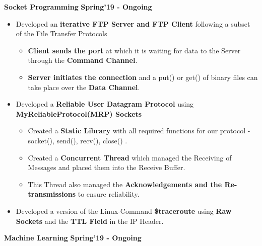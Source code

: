 \documentclass[10pt]{article}
\begin{document}
\large {\textbf{Socket Programming}} \normalsize 
\href{https://github.com/shmundhra/Socket-Programming}{\faGithub}
{\hfill} \textbf{Spring'19 - Ongoing}\\[-1.7em]
\begin{itemize}
\item 
\begingroup
    \fontsize{11pt}{12pt}\selectfont
    Developed an \textbf{iterative FTP Server and FTP Client} following a subset of the File Transfer Protocols \\[-1.7em]   
\endgroup
    \begin{itemize}
    \item \textbf{Client sends the port} at which it is waiting for data to the Server through the \textbf{Command Channel}. \\[-1.65em]
    \item \textbf{Server initiates the connection} and a put() or get() of binary files can take place over the \textbf{Data Channel}. \\[-1.65em]
    \end{itemize}
\item 
\begingroup
    \fontsize{11pt}{12pt}\selectfont
    Developed a \textbf{Reliable User Datagram Protocol} using \textbf{MyReliableProtocol(MRP) Sockets} \\[-1.75em]
\endgroup
    \begin{itemize}
    \item Created a \textbf{Static Library} with all required functions for our protocol - socket(), send(), recv(), close() .\\[-1.60em]
    \item Created a \textbf{Concurrent Thread} which managed the Receiving of Messages and placed them into the Receive Buffer.\\[-1.60em]
    \item This Thread also managed the \textbf{Acknowledgements and the Re-transmissions} to ensure reliability. \\[-1.75em]
    \end{itemize}
\item Developed a version of the Linux-Command \textbf{\$traceroute} using \textbf{Raw Sockets} and the \textbf{TTL Field} in the IP Header.
\end{itemize}
\large {\textbf{Machine Learning}} \normalsize 
\href{https://github.com/shmundhra/Machine-Learning}{\faGithub}
{\hfill} \textbf{Spring'19 - Ongoing}\\[-1.8em]
\end{document}
